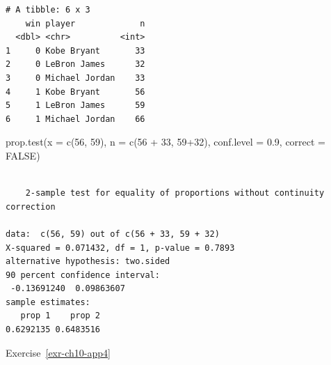 \documentclass[
  letterpaper,
  DIV=11,
  numbers=noendperiod]{scrreprt}
\newenvironment{Shaded}{\begin{snugshade}}{\end{snugshade}}
\newcommand{\AttributeTok}[1]{\textcolor[rgb]{0.40,0.45,0.13}{#1}}
\newcommand{\ConstantTok}[1]{\textcolor[rgb]{0.56,0.35,0.01}{#1}}
\newcommand{\DecValTok}[1]{\textcolor[rgb]{0.68,0.00,0.00}{#1}}
\newcommand{\FloatTok}[1]{\textcolor[rgb]{0.68,0.00,0.00}{#1}}
\newcommand{\FunctionTok}[1]{\textcolor[rgb]{0.28,0.35,0.67}{#1}}
\newcommand{\NormalTok}[1]{\textcolor[rgb]{0.00,0.23,0.31}{#1}}
\newcommand{\OtherTok}[1]{\textcolor[rgb]{0.00,0.23,0.31}{#1}}
\newcommand{\SpecialCharTok}[1]{\textcolor[rgb]{0.37,0.37,0.37}{#1}}
\newcommand{\StringTok}[1]{\textcolor[rgb]{0.13,0.47,0.30}{#1}}
\theoremstyle{definition}
\theoremstyle{remark}
\begin{document}
\begin{verbatim}
# A tibble: 6 x 3
    win player             n
  <dbl> <chr>          <int>
1     0 Kobe Bryant       33
2     0 LeBron James      32
3     0 Michael Jordan    33
4     1 Kobe Bryant       56
5     1 LeBron James      59
6     1 Michael Jordan    66
\end{verbatim}

\begin{Shaded}
\begin{Highlighting}[]
\FunctionTok{prop.test}\NormalTok{(}\AttributeTok{x =} \FunctionTok{c}\NormalTok{(}\DecValTok{56}\NormalTok{, }\DecValTok{59}\NormalTok{), }\AttributeTok{n =} \FunctionTok{c}\NormalTok{(}\DecValTok{56} \SpecialCharTok{+} \DecValTok{33}\NormalTok{, }\DecValTok{59}\SpecialCharTok{+}\DecValTok{32}\NormalTok{), }\AttributeTok{conf.level =} \FloatTok{0.9}\NormalTok{, }\AttributeTok{correct =} \ConstantTok{FALSE}\NormalTok{)}
\end{Highlighting}
\end{Shaded}

\begin{verbatim}

    2-sample test for equality of proportions without continuity correction

data:  c(56, 59) out of c(56 + 33, 59 + 32)
X-squared = 0.071432, df = 1, p-value = 0.7893
alternative hypothesis: two.sided
90 percent confidence interval:
 -0.13691240  0.09863607
sample estimates:
   prop 1    prop 2 
0.6292135 0.6483516 
\end{verbatim}

Exercise~\ref{exr-ch10-app4}

\begin{Shaded}
\end{Shaded}
\end{document}
